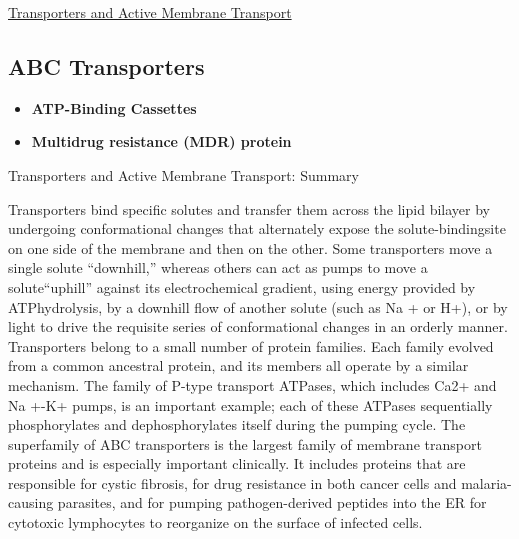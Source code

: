 \documentclass[12pt,letterpaper]{article}
\begin{document}
\begin{secbox}{\hyperlink{11}{Transporters and Active Membrane Transport}}
{    \hypertarget{11.2.6}{\subsection*{ABC Transporters}}
    \begin{itemize}
        \item \textbf{ATP-Binding Cassettes}
        \item \textbf{Multidrug resistance (MDR) protein}
    \end{itemize}
    
    \begin{probbox}{Transporters and Active Membrane Transport: Summary}\end{probbox}
        Transporters bind specific solutes and transfer them across the lipid bilayer by undergoing conformational changes that alternately expose the solute-bindingsite on one side of the membrane and then on the other. Some transporters move a single solute “downhill,” whereas others can act as pumps to move a solute“uphill” against its electrochemical gradient, using energy provided by ATPhydrolysis, by a downhill flow of another solute (such as Na + or H+), or by light to drive the requisite series of conformational changes in an orderly manner. Transporters belong to a small number of protein families. Each family evolved from a common ancestral protein, and its members all operate by a similar mechanism. The family of P-type transport ATPases, which includes Ca2+ and Na +-K+ pumps, is an important example; each of these ATPases sequentially phosphorylates and dephosphorylates itself during the pumping cycle. The superfamily of ABC transporters is the largest family of membrane transport proteins and is especially important clinically. It includes proteins that are responsible for cystic fibrosis, for drug resistance in both cancer cells and malaria-causing parasites, and for pumping pathogen-derived peptides into the ER for cytotoxic lymphocytes to reorganize on the surface of infected cells.
}\end{secbox}
\end{document}
